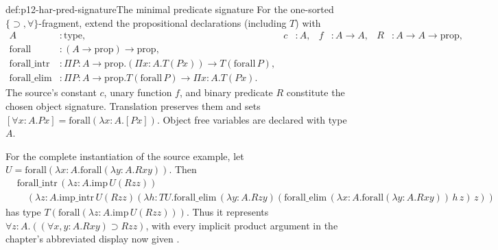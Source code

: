 \begin{hbdefinition}{def:p12-har-pred-signature}{The minimal predicate signature}
For the one-sorted \(\{\supset,\forall\}\)-fragment, extend the
propositional declarations (including \(T\)) with
\[
\begin{aligned}
 A&:\mathrm{type},&c&:A,&f&:A\to A,&R&:A\to A\to\mathrm{prop},\\
 \mathrm{forall}&:(A\to\mathrm{prop})\to\mathrm{prop},\\
 \mathrm{forall\_intr}&:\Pi P:A\to\mathrm{prop}.
             (\Pi x:A.T(Px))\to T(\mathrm{forall}\,P),\\
 \mathrm{forall\_elim}&:\Pi P:A\to\mathrm{prop}.
             T(\mathrm{forall}\,P)\to\Pi x:A.T(Px).
\end{aligned}
\]
The source's constant \(c\), unary function \(f\), and binary
predicate \(R\) constitute the chosen object signature. Translation
preserves them and sets
\([\forall x:A.Px]=\mathrm{forall}(\lambda x:A.[Px])\).
Object free variables are declared with type \(A\).

For the complete instantiation of the source example, let
\(U=\mathrm{forall}(\lambda x:A.
\mathrm{forall}(\lambda y:A.Rxy))\). Then
\[
\begin{aligned}
 &\mathrm{forall\_intr}\,(\lambda z:A.\mathrm{imp}\,U(Rzz))\\
 &\quad(\lambda z:A.\mathrm{imp\_intr}\,U(Rzz)
   (\lambda h:T U.
     \mathrm{forall\_elim}\,(\lambda y:A.Rzy)
      (\mathrm{forall\_elim}\,(\lambda x:A.
          \mathrm{forall}(\lambda y:A.Rxy))\,h\,z)\,z))
\end{aligned}
\]
has type \(T(\mathrm{forall}(\lambda z:A.
\mathrm{imp}\,U(Rzz)))\). Thus it represents
\(\forall z:A.((\forall x,y:A.Rxy)\supset Rzz)\), with every
implicit product argument in the chapter's abbreviated display now given
\cite[p.~1162]{BarendregtGeuvers2001}.
\end{hbdefinition}

